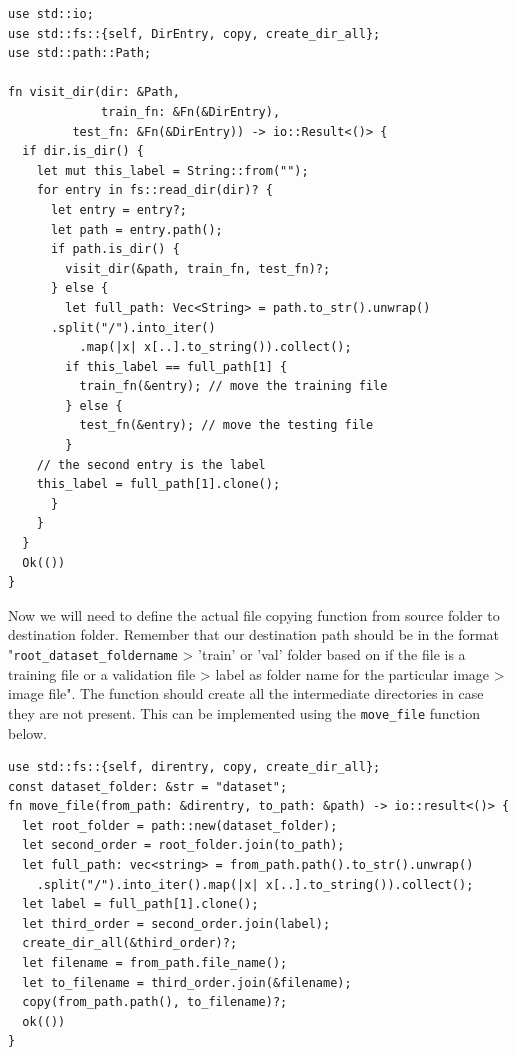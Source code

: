 \documentclass{book}
\begin{document}
\begin{lstlisting}[caption={chapter6/pytorch-image-classification/src/main.rs}, basicstyle=\small]
use std::io;
use std::fs::{self, DirEntry, copy, create_dir_all};
use std::path::Path;

fn visit_dir(dir: &Path,
             train_fn: &Fn(&DirEntry),
	     test_fn: &Fn(&DirEntry)) -> io::Result<()> {
  if dir.is_dir() {
    let mut this_label = String::from("");
    for entry in fs::read_dir(dir)? {
      let entry = entry?;
      let path = entry.path();
      if path.is_dir() {
        visit_dir(&path, train_fn, test_fn)?;
      } else {
        let full_path: Vec<String> = path.to_str().unwrap()
	  .split("/").into_iter()
          .map(|x| x[..].to_string()).collect();
        if this_label == full_path[1] {
          train_fn(&entry); // move the training file
        } else {
          test_fn(&entry); // move the testing file
        }
	// the second entry is the label
	this_label = full_path[1].clone();
      }
    }
  }
  Ok(())
}
\end{lstlisting}

Now we will need to define the actual file copying function from source folder to destination folder. Remember that our destination path should be in the format "\lstinline{root_dataset_foldername} > 'train' or 'val' folder based on if the file is a training file or a validation file > label as folder name for the particular image > image file". The function should create all the intermediate directories in case they are not present. This can be implemented using the \lstinline{move_file} function below.

\begin{lstlisting}[caption={chapter6/pytorch-image-classification/src/main.rs}, basicstyle=\small]
use std::fs::{self, direntry, copy, create_dir_all};
const dataset_folder: &str = "dataset";
fn move_file(from_path: &direntry, to_path: &path) -> io::result<()> {
  let root_folder = path::new(dataset_folder);
  let second_order = root_folder.join(to_path);
  let full_path: vec<string> = from_path.path().to_str().unwrap()
    .split("/").into_iter().map(|x| x[..].to_string()).collect();
  let label = full_path[1].clone();
  let third_order = second_order.join(label);
  create_dir_all(&third_order)?;
  let filename = from_path.file_name();
  let to_filename = third_order.join(&filename);
  copy(from_path.path(), to_filename)?;
  ok(())
}
\end{lstlisting}
\end{document}

